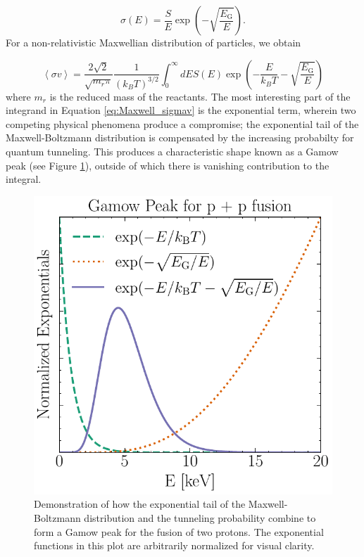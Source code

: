 \documentclass[12pt]{article}
\newcommand{\bigparenthesis}[1]{\left(#1\right)}
\begin{document}
\begin{equation}
    \sigma(E) = \frac{S}{E} \exp\bigparenthesis{-\sqrt{\frac{E_\mathrm{G}}{E}}}.
\end{equation}
%
For a non-relativistic Maxwellian distribution of particles, we obtain

\begin{equation}
     \left< \sigma v \right> = \frac{2\sqrt{2}}{\sqrt{m_r\pi}} \frac{1}{(k_B T)^{3/2}} \int_0^\infty dE S(E) \exp\bigparenthesis{-\frac{E}{k_B T} -\sqrt{\frac{E_\mathrm{G}}{E}}} \label{eq:Maxwell_sigmav}
\end{equation}
%
where $m_r$ is the reduced mass of the reactants. The most interesting part of the integrand in Equation \ref{eq:Maxwell_sigmav} is the exponential term, wherein two competing physical phenomena produce a compromise; the exponential tail of the Maxwell-Boltzmann distribution is compensated by the increasing probabilty for quantum tunneling. This produces a characteristic shape known as a Gamow peak (see Figure \ref{fig:Gamow}), outside of which there is vanishing contribution to the integral. 

\begin{figure}
    \centering
    \includegraphics[width=0.5\linewidth]{Main Graphics/Gamow.pdf}
    \caption{Demonstration of how the exponential tail of the Maxwell-Boltzmann distribution and the tunneling probability combine to form a Gamow peak for the fusion of two protons. The exponential functions in this plot are arbitrarily normalized for visual clarity.}
    \label{fig:Gamow}
\end{figure}
\end{document}
